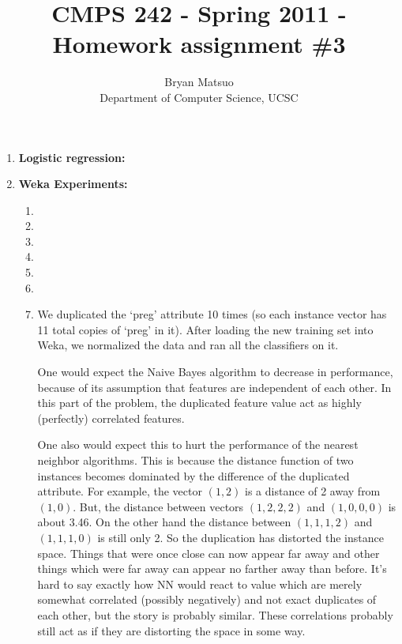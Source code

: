 \documentclass[11pt]{article}
\begin{document}
\title{CMPS 242 - Spring 2011 - Homework assignment \#3}
\author{ {Bryan Matsuo}\\
{Department of Computer Science, UCSC}}
\maketitle

\begin{enumerate}
\item \textbf{Logistic regression:}

\item \textbf{Weka Experiments:}

\begin{enumerate}
\item %

\item %

\item %

\item %

\item %

\item %

\item %

    We duplicated the `preg' attribute 10 times (so each instance vector has
    11 total copies of `preg' in it). After loading the new training set into
    Weka, we normalized the data and ran all the classifiers on it.

    One would expect the Naive Bayes algorithm to decrease in performance,
    because of its assumption that features are independent of each other.
    In this part of the problem, the duplicated feature value act as highly
    (perfectly) correlated features.

    One also would expect this to hurt the performance of the nearest
    neighbor algorithms. This is because the distance function of two instances
    becomes dominated by the difference of the duplicated attribute. For
    example, the vector $(1,2)$ is a distance of 2 away from $(1,0)$. But, the
    distance between vectors $(1,2,2,2)$ and $(1,0,0,0)$ is about 3.46.
    On the other hand the distance between $(1,1,1,2)$ and $(1,1,1,0)$ is
    still only 2. So the duplication has distorted the instance space.
    Things that were once close can now appear far away and other things
    which were far away can appear no farther away than before. It's hard to
    say exactly how NN would react to value which are merely somewhat correlated
    (possibly negatively) and not exact duplicates of each other, but the story
    is probably similar. These correlations probably still act as if they are
    distorting the space in some way.


\end{enumerate}
\end{enumerate}
\end{document}
